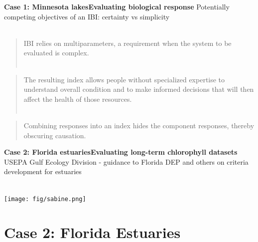 \documentclass[serif]{beamer}\usepackage[]{graphicx}\usepackage[]{color}
\begin{document}
\begin{frame}{\textbf{Case 1: Minnesota lakes}}{\textbf{Evaluating biological response}}
Potentially competing objectives of an IBI: certainty vs simplicity \\~\\
\pause
\begin{quote}
IBI relies on multiparameters, a requirement when the system to be evaluated is complex. \cite{Karr86} \\~\\
\end{quote}
\begin{quote}
The resulting index allows people without specialized expertise to understand overall condition and to make informed decisions that will then affect the health of those resources. \cite{Karr99} \\~\\
\end{quote}
\pause
\begin{quote}
Combining responses into an index hides the component responses, thereby obscuring causation. \cite{Suter93}
\end{quote}
\end{frame}

\begin{frame}{\textbf{Case 2: Florida estuaries}}{\textbf{Evaluating long-term chlorophyll datasets}}
USEPA Gulf Ecology Division - guidance to Florida DEP and others on criteria development for estuaries \\~\\
\centerline{\texttt{[image: fig/sabine.png]}}
\end{frame}

\section{Case 2: Florida Estuaries}

\end{document}
